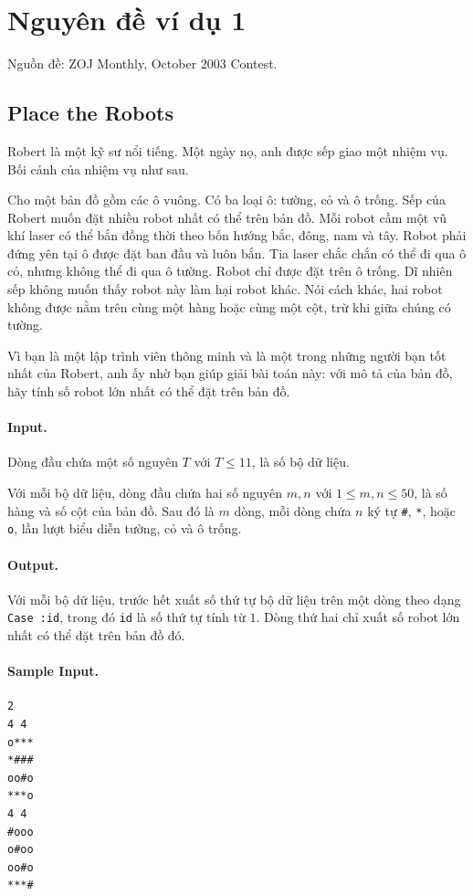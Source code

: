 \documentclass[11pt]{article}
\begin{document}
\appendix

\section{Nguyên đề ví dụ 1}

Nguồn đề: ZOJ Monthly, October 2003 Contest.

\subsection*{Place the Robots}

Robert là một kỹ sư nổi tiếng. Một ngày nọ, anh được sếp giao một nhiệm vụ.
Bối cảnh của nhiệm vụ như sau.

Cho một bản đồ gồm các ô vuông. Có ba loại ô: tường, cỏ và ô trống. Sếp của
Robert muốn đặt nhiều robot nhất có thể trên bản đồ. Mỗi robot cầm một vũ khí
laser có thể bắn đồng thời theo bốn hướng bắc, đông, nam và tây. Robot phải
đứng yên tại ô được đặt ban đầu và luôn bắn. Tia laser chắc chắn có thể đi qua
ô cỏ, nhưng không thể đi qua ô tường. Robot chỉ được đặt trên ô trống. Dĩ
nhiên sếp không muốn thấy robot này làm hại robot khác. Nói cách khác, hai
robot không được nằm trên cùng một hàng hoặc cùng một cột, trừ khi giữa chúng
có tường.

Vì bạn là một lập trình viên thông minh và là một trong những người bạn tốt
nhất của Robert, anh ấy nhờ bạn giúp giải bài toán này: với mô tả của bản đồ,
hãy tính số robot lớn nhất có thể đặt trên bản đồ.

\paragraph{Input.}
Dòng đầu chứa một số nguyên $T$ với $T\le 11$, là số bộ dữ liệu.

Với mỗi bộ dữ liệu, dòng đầu chứa hai số nguyên $m,n$ với $1\le m,n\le 50$,
là số hàng và số cột của bản đồ. Sau đó là $m$ dòng, mỗi dòng chứa $n$ ký tự
\texttt{\#}, \texttt{*}, hoặc \texttt{o}, lần lượt biểu diễn tường, cỏ và ô
trống.

\paragraph{Output.}
Với mỗi bộ dữ liệu, trước hết xuất số thứ tự bộ dữ liệu trên một dòng theo
dạng \texttt{Case :id}, trong đó \texttt{id} là số thứ tự tính từ $1$. Dòng
thứ hai chỉ xuất số robot lớn nhất có thể đặt trên bản đồ đó.

\paragraph{Sample Input.}
\begin{verbatim}
2
4 4
o***
*###
oo#o
***o
4 4
#ooo
o#oo
oo#o
***#
\end{verbatim}
\end{document}
